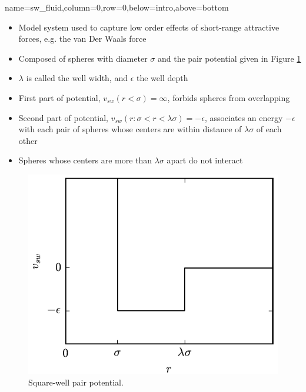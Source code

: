 \documentclass[paperwidth=48in,paperheight=36in,
fontscale=0.27,margin=0.75in]{baposter}
\begin{document}
\begin{poster}
  {name=sw_fluid,column=0,row=0,below=intro,above=bottom}{%




    \begin{itemize}
    \item Model system used to capture low order effects of
      short-range attractive forces, e.g. the van Der Waals force
    \item Composed of spheres with diameter $\sigma$ and the pair
      potential given in Figure \ref{fig:pair_potential}
    \item $\lambda$ is called the well width, and $\epsilon$ the well
      depth
    \item First part of potential, $v_{sw}(r<\sigma)=\infty$,
      forbids spheres from overlapping
    \item Second part of potential,
      $v_{sw}(r:\sigma<r<\lambda\sigma)=-\epsilon$, associates an
      energy $-\epsilon$ with each pair of spheres whose centers are
      within distance of $\lambda\sigma$ of each other
    \item Spheres whose centers are more than $\lambda\sigma$ apart do
      not interact
    \end{itemize}

    \begin{figure}[H]
      \centering
      \includegraphics[width=0.45\columnwidth]{figs/square-well.pdf}
      \caption{Square-well pair potential.}
      \label{fig:pair_potential}
    \end{figure}

}
\end{poster}
\end{document}
